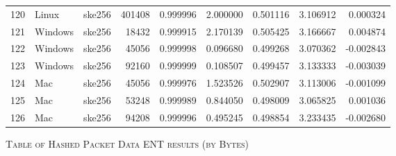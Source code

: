 \documentclass{IEEEtran}
\begin{document}
\begin{longtable}{rllrrrrrr}
  120 & Linux & ske256 &  401408 & 0.999996 & 2.000000 & 0.501116 & 3.106912 & 0.000324 \\ 
  121 & Windows & ske256 &   18432 & 0.999915 & 2.170139 & 0.505425 & 3.166667 & 0.004874 \\ 
  122 & Windows & ske256 &   45056 & 0.999998 & 0.096680 & 0.499268 & 3.070362 & -0.002843 \\ 
  123 & Windows & ske256 &   92160 & 0.999999 & 0.108507 & 0.499457 & 3.133333 & -0.003039 \\ 
  124 & Mac & ske256 &   45056 & 0.999976 & 1.523526 & 0.502907 & 3.113006 & -0.001099 \\ 
  125 & Mac & ske256 &   53248 & 0.999989 & 0.844050 & 0.498009 & 3.065825 & 0.001036 \\ 
  126 & Mac & ske256 &   94208 & 0.999996 & 0.495245 & 0.498854 & 3.233435 & -0.002680 \\ 
  \hline
\end{longtable}
\begin{center}
\textsc{Table of Hashed Packet Data ENT results (by Bytes)}
\end{center}
\end{document}
